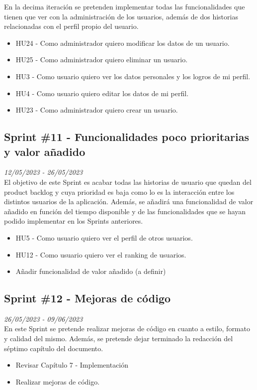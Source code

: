En la decima iteración se pretenden implementar todas las funcionalidades que tienen que ver con la administración de los usuarios, además de
dos historias relacionadas con el perfil propio del usuario.
\begin{itemize}
    \item HU24 - Como administrador quiero modificar los datos de un usuario.
    \item HU25 - Como administrador quiero eliminar un usuario.
    \item HU3 - Como usuario quiero ver los datos personales y los logros de mi perfil.
    \item HU4 - Como usuario quiero editar los datos de mi perfil.
    \item HU23 - Como administrador quiero crear un usuario.

\end{itemize}

\subsection{Sprint \#11 - Funcionalidades poco prioritarias y valor añadido}
\textit{12/05/2023   -   26/05/2023}\\

El objetivo de este Sprint es acabar todas las historias de usuario que quedan del product backlog y cuya prioridad es baja como lo es la interacción entre los distintos usuarios de la aplicación. Además, se añadirá una funcionalidad de valor añadido
en función del tiempo disponible y de las funcionalidades que se hayan podido implementar en los Sprints anteriores.
\begin{itemize}
    \item HU5 - Como usuario quiero ver el perfil de otros usuarios.
    \item HU12 - Como usuario quiero ver el ranking de usuarios.
    \item Añadir funcionalidad de valor añadido (a definir)
\end{itemize}

\subsection{Sprint \#12 - Mejoras de código}
\textit{26/05/2023   -   09/06/2023}\\

En este Sprint se pretende realizar mejoras de código en cuanto a estilo, formato y calidad del mismo. Además, se pretende dejar terminado la redacción
del séptimo capítulo del documento.
\begin{itemize}
    \item Revisar Capítulo 7 - Implementación
    \item Realizar mejoras de código.
\end{itemize}

